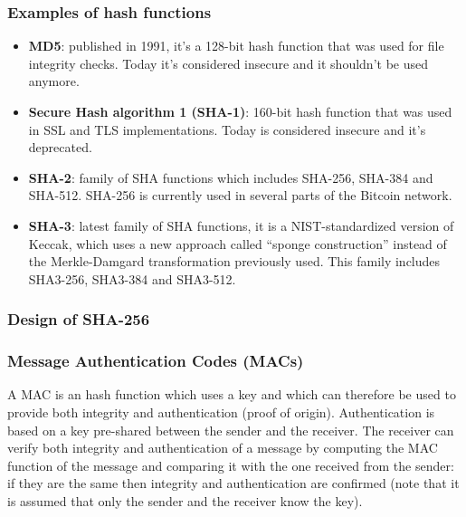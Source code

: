 \subsubsection{Examples of hash functions}
\begin{itemize}
  \item \textbf{MD5}: published in 1991, it's a 128-bit hash function that was
  used for file integrity checks. Today it's considered insecure and it shouldn't
  be used anymore.
  \item \textbf{Secure Hash algorithm 1 (SHA-1)}: 160-bit hash function that was
  used in SSL and TLS implementations. Today is considered insecure and it's
  deprecated.
  \item \textbf{SHA-2}: family of SHA functions which includes SHA-256, SHA-384
  and SHA-512. SHA-256 is currently used in several parts of the Bitcoin network.
  \item \textbf{SHA-3}: latest family of SHA functions, it is a NIST-standardized
  version of Keccak, which uses a new approach called ``sponge construction''
  instead of the Merkle-Damgard transformation previously used. This family
  includes SHA3-256, SHA3-384 and SHA3-512.
\end{itemize}

\subsubsection{Design of SHA-256}

\subsubsection{Message Authentication Codes (MACs)}
A MAC is an hash function which uses a key and which can therefore be used to
provide both integrity and authentication (proof of origin). Authentication is
based on a key pre-shared between the sender and the receiver. The receiver can
verify both integrity and authentication of a message by computing the MAC function
of the message and comparing it with the one received from the sender: if they are the
same then integrity and authentication are confirmed (note that it is assumed that
only the sender and the receiver know the key).

